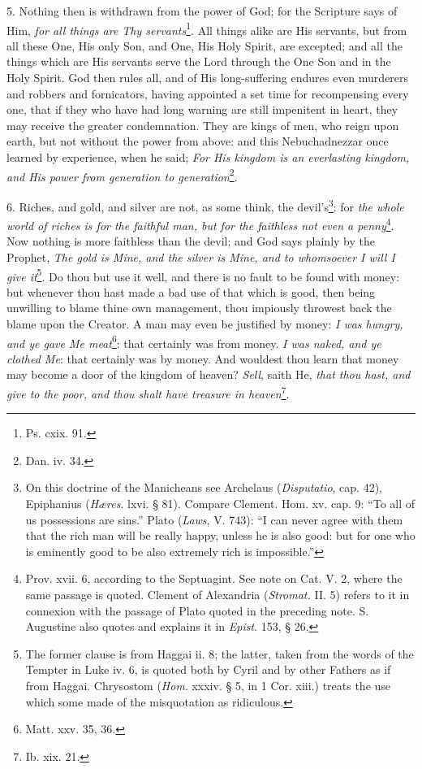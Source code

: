 5. Nothing then is withdrawn from the power of God; for the Scripture says of Him, \emph{for all things are Thy servants}\footnote{Ps. cxix. 91.}. All things alike are His servants, but from all these One, His only Son, and One, His Holy Spirit, are excepted; and all the things which are His servants serve the Lord through the One Son and in the Holy Spirit. God then rules all, and of His long-suffering endures even murderers and robbers and fornicators, having appointed a set time for recompensing every one, that if they who have had long warning are still impenitent in heart, they may receive the greater condemnation. They are kings of men, who reign upon earth, but not without the power from above: and this Nebuchadnezzar once learned by experience, when he said; \emph{For His kingdom is an everlasting kingdom, and His power from generation to generation}\footnote{Dan. iv. 34.}.

6. Riches, and gold, and silver are not, as some think, the devil’s\footnote{On this doctrine of the Manicheans see Archelaus (\emph{Disputatio}, cap. 42), Epiphanius (\emph{Hæres}. lxvi. § 81). Compare Clement. Hom. xv. cap. 9: “To all of us possessions are sins.” Plato (\emph{Laws}, V. 743): “I can never agree with them that the rich man will be really happy, unless he is also good: but for one who is eminently good to be also extremely rich is impossible.”}: for \emph{the whole world of riches is for the faithful man, but for the faithless not even a penny}\footnote{Prov. xvii. 6, according to the Septuagint. See note on Cat. V. 2, where the same passage is quoted. Clement of Alexandria (\emph{Stromat.} II. 5) refers to it in connexion with the passage of Plato quoted in the preceding note. S. Augustine also quotes and explains it in \emph{Epist}. 153, § 26.}. Now nothing is more faithless than the devil; and God says plainly by the Prophet, \emph{The gold is Mine, and the silver is Mine, and to whomsoever I will I give it}\footnote{The former clause is from Haggai ii. 8; the latter, taken from the words of the Tempter in Luke iv. 6, is quoted both by Cyril and by other Fathers as if from Haggai. Chrysostom (\emph{Hom}. xxxiv. § 5, in 1 Cor. xiii.) treats the use which some made of the misquotation as ridiculous.}. Do thou but use it well, and there is no fault to be found with money: but whenever thou hast made a bad use of that which is good, then being unwilling to blame thine own management, thou impiously throwest back the blame upon the Creator. A man may even be justified by money: \emph{I was hungry, and ye gave Me meat}\footnote{Matt. xxv. 35, 36.}: that certainly was from money. \emph{I was naked, and ye clothed Me}: that certainly was by money. And wouldest thou learn that money may become a door of the kingdom of heaven? \emph{Sell}, saith He, \emph{that thou hast, and give to the poor, and thou shalt have treasure in heaven}\footnote{Ib. xix. 21.}.

